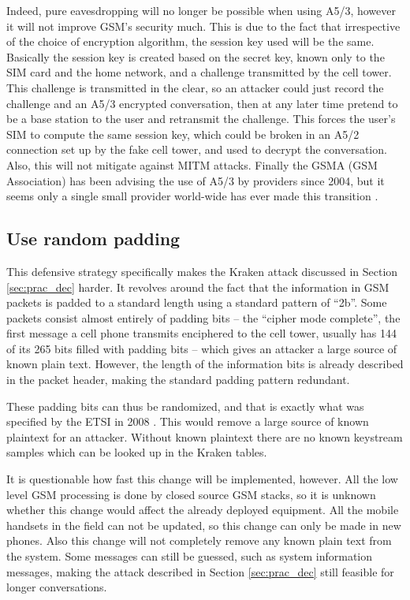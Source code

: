 \documentclass[a4paper,11pt]{llncs}
\begin{document}
Indeed, pure eavesdropping will no longer be possible when using A5/3, however it will not improve GSM's security much. This is due to the fact that irrespective of the choice of encryption algorithm, the session key used will be the same. Basically the session key is created based on the secret key, known only to the SIM card and the home network, and a challenge transmitted by the cell tower. This challenge is transmitted in the clear, so an attacker could just record the challenge and an A5/3 encrypted conversation, then at any later time pretend to be a base station to the user and retransmit the challenge. This forces the user's SIM to compute the same session key, which could be broken in an A5/2 connection set up by the fake cell tower, and used to decrypt the conversation. Also, this will not mitigate against MITM attacks.
Finally the GSMA (GSM Association) has been advising the use of A5/3 by providers since 2004, but it seems only a single small provider world-wide has ever made this transition \cite{nohlA51}.

\subsection{Use random padding}
This defensive strategy specifically makes the Kraken attack discussed in Section \ref{sec:prac_dec} harder. It revolves around the fact that the information in GSM packets is padded to a standard length using a standard pattern of ``2b''. Some packets consist almost entirely of padding bits -- the ``cipher mode complete'', the first message a cell phone transmits enciphered to the cell tower, usually has 144 of its 265 bits filled with padding bits -- which gives an attacker a large source of known plain text. However, the length of the information bits is already described in the packet header, making the standard padding pattern redundant.

These padding bits can thus be randomized, and that is exactly what was specified by the ETSI in 2008 \cite{etsi:random}. This would remove a large source of known plaintext for an attacker. Without known plaintext there are no known keystream samples which can be looked up in the Kraken tables.

It is questionable how fast this change will be implemented, however. All the low level GSM processing is done by closed source GSM stacks, so it is unknown whether this change would affect the already deployed equipment. All the mobile handsets in the field can not be updated, so this change can only be made in new phones. Also this change will not completely remove any known plain text from the system. Some messages can still be guessed, such as system information messages, making the attack described in Section \ref{sec:prac_dec} still feasible for longer conversations.
\end{document}
